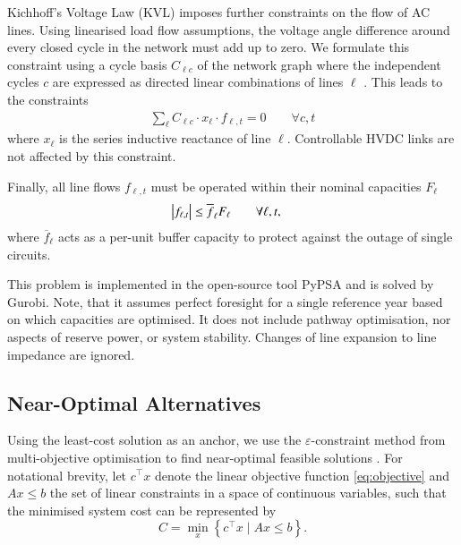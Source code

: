 Kichhoff's Voltage Law (KVL) imposes further constraints on the flow of AC lines.
Using linearised load flow assumptions, the voltage angle difference around every closed cycle in the
network must add up to zero. We formulate this constraint using a cycle basis $C_{\ell c}$
of the network graph where the independent cycles $c$ are expressed as
directed linear combinations of lines $\ell$ \cite{cycleflows}.
This leads to the constraints
\begin{align}
    \sum_\ell C_{\ell c} \cdot x_\ell \cdot f_{\ell,t} = 0 \qquad\forall c,t
    \label{eq:kvl}
\end{align}
where $x_\ell$ is the series inductive reactance of line $\ell$.
Controllable HVDC links are not affected by this constraint.

Finally, all line flows $f_{\ell,t}$ must be operated within their nominal capacities $F_\ell$
\begin{align}
    \left|f_{\ell,t}\right| \leq \overline{f}_{\ell} F_{\ell} & \qquad\forall \ell, t,
    \label{eq:lastA}
\end{align}
where $\overline{f}_\ell$ acts as a per-unit buffer capacity
to protect against the outage of single circuits.

This problem is implemented in the open-source tool PyPSA \cite{pypsa} and is solved by Gurobi.
Note, that it assumes perfect foresight for a single reference year based on which capacities are optimised.
It does not include pathway optimisation, nor aspects of reserve power, or system stability.
Changes of line expansion to line impedance are ignored.

\subsection{Near-Optimal Alternatives}

Using the least-cost solution as an anchor, we use the
$\varepsilon$-constraint method from multi-objective optimisation
to find near-optimal feasible solutions \cite{nearoptimal,mavrotas_effective_2009}.
For notational brevity, let $c^\top x$ denote the linear objective function \cref{eq:objective}
and $Ax\leq b$ the set of linear constraints 
in a space of continuous variables, 
such that the minimised system cost can be represented by
\begin{equation}
    C = \min_x\left\{c^\top x \mid Ax\leq b\right\}.
\end{equation}


